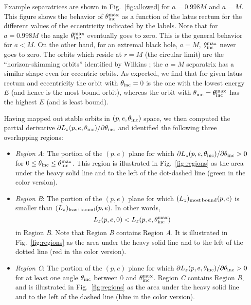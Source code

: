 \documentclass[aps,prd,twocolumn,showpacs,groupedaddress,nofootinbib]{revtex4}
\begin{document}
Example separatrices are shown in Fig.~\ref{fig:allowed}
for $a=0.998M$ and $a=M$.  This
figure shows the behavior of $\theta_{\rm inc}^{\rm max}$ as a
function of the latus rectum for the different values of the
eccentricity indicated by the labels.  Note that for $a=0.998M$ the
angle $\theta_{\rm inc}^{\rm max}$ eventually goes to zero.  This is
the general behavior for $a<M$. On the other hand, for an extremal
black hole, $a = M$, $\theta_{\rm inc}^{\rm max}$ never goes to
zero.  The orbits which reside at $r = M$ (the circular limit) are the
``horizon-skimming orbits'' identified by Wilkins {\cite{wilkins}};
the $a = M$ separatrix has a similar shape even for eccentric orbits.
As expected, we find that for given latus rectum and eccentricity the
orbit with $\theta_{\rm inc}=0$ is the one with the lowest energy $E$
(and hence is the most-bound orbit), whereas the orbit with
$\theta_{\rm inc}=\theta_{\rm inc}^{\rm max}$ has the highest $E$
(and is least bound).

Having mapped out stable orbits in $(p,e,\theta_{\rm inc})$ space, we
then computed the partial derivative $\partial L_z(p,e,\theta_{\rm
inc})/\partial\theta_{\rm inc}$ and identified the following three
overlapping regions:

\begin{itemize}

\item \textit{Region A}: The portion of the $(p,e)$ plane for which
  $\partial L_z(p,e,\theta_{\rm inc})/\partial\theta_{\rm inc}>0$ for
  $0 \le \theta_{\rm inc} \le \theta_{\rm inc}^{\rm max}$.  This
  region is illustrated in Fig.\ {\ref{fig:regions}} as the area under
  the heavy solid line and to the left of the dot-dashed line (green in
  the color version).

\item \textit{Region B}: The portion of the $(p,e)$ plane for which
  $(L_z)_{\rm most\,bound}(p,e)$ is smaller than $(L_z)_{\rm
  least\,bound}(p,e)$.  In other words,
\begin{equation}
L_z(p,e,0) < L_z(p,e,\theta_{\rm inc}^{\rm max})
\end{equation}
  in Region \textit{B}.  Note that Region \textit{B} contains Region
  \textit{A}.  It is illustrated in Fig.\ {\ref{fig:regions}} as the
  area under the heavy solid line and to the left of the dotted line
  (red in the color version).

\item \textit{Region C}: The portion of the $(p,e)$ plane for which
  $\partial L_z(p,e,\theta_{\rm inc})/\partial\theta_{\rm inc}>0$ for
  at least one angle $\theta_{\rm inc}$ between $0$ and $\theta_{\rm
  inc}^{\rm max}$.  Region \textit{C} contains Region \textit{B}, and
  is illustrated in Fig.\ {\ref{fig:regions}} as the area under the
  heavy solid line and to the left of the dashed line (blue in the
  color version).

\end{itemize}
\end{document}

